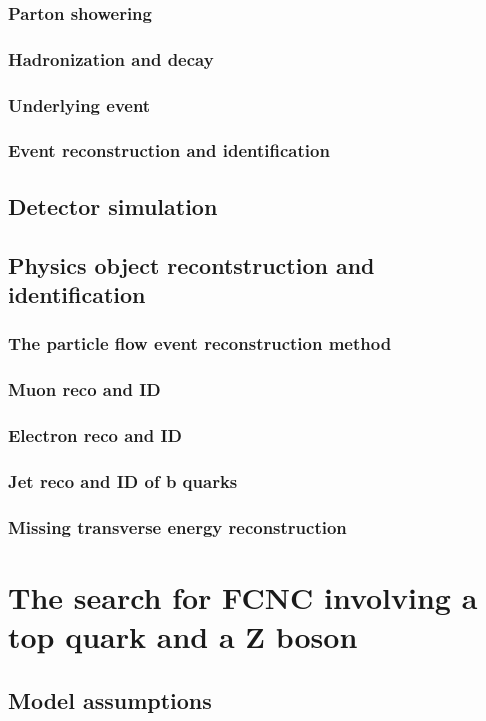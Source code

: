 \subsection{Parton showering}
\subsection{Hadronization and decay}
\subsection{Underlying event}
\subsection[Reconstruction]{Event reconstruction and identification}
\section{Detector simulation}
\section{Physics object recontstruction and identification}
\subsection{The particle flow event reconstruction method}
\subsection{Muon reco and ID}
\subsection{Electron reco and ID}
\subsection{Jet reco and ID of b quarks}
\subsection{Missing transverse energy reconstruction}

\chapter{The search for FCNC involving a top quark and a Z boson}
\section[Assumtions]{Model assumptions}
